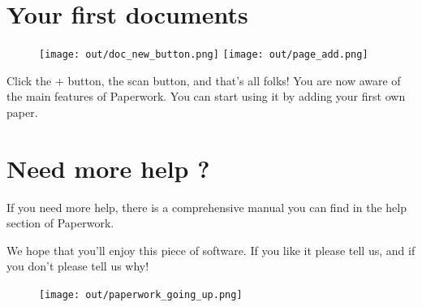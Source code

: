 \documentclass[10pt,a4paper]{article}
\begin{document}
\section{Your first documents}

\begin{figure}[h]
	\centering
	\texttt{[image: out/doc\_new\_button.png]}
	\texttt{[image: out/page\_add.png]}
\end{figure}

Click the + button, the scan button, and that's all folks! You are now aware
of the main features of Paperwork. You can start using it by adding your first
own paper.


\section{Need more help ?}

\begin{figure}[H]
	\centering
\end{figure}

If you need more help, there is a comprehensive manual you can find in the help
section of Paperwork.

We hope that you'll enjoy this piece of software. If you like it please tell
us, and if you don't please tell us why!

\begin{figure}[b]
	\texttt{[image: out/paperwork\_going\_up.png]}
\end{figure}
\end{document}
